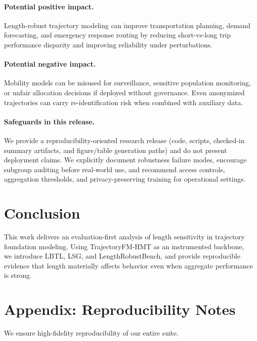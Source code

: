 \documentclass{article}
\begin{document}
\paragraph{Potential positive impact.}
Length-robust trajectory modeling can improve transportation planning, demand forecasting, and emergency response routing by reducing short-vs-long trip performance disparity and improving reliability under perturbations.

\paragraph{Potential negative impact.}
Mobility models can be misused for surveillance, sensitive population monitoring, or unfair allocation decisions if deployed without governance. Even anonymized trajectories can carry re-identification risk when combined with auxiliary data.

\paragraph{Safeguards in this release.}
We provide a reproducibility-oriented research release (code, scripts, checked-in summary artifacts, and figure/table generation paths) and do not present deployment claims. We explicitly document robustness failure modes, encourage subgroup auditing before real-world use, and recommend access controls, aggregation thresholds, and privacy-preserving training for operational settings.

\section{Conclusion}
This work delivers an evaluation-first analysis of length sensitivity in trajectory foundation modeling. Using TrajectoryFM-HMT as an instrumented backbone, we introduce LBTL, LSG, and LengthRobustBench, and provide reproducible evidence that length materially affects behavior even when aggregate performance is strong.

\appendix
\section{Appendix: Reproducibility Notes}
We ensure high-fidelity reproducibility of our entire suite.
\end{document}
